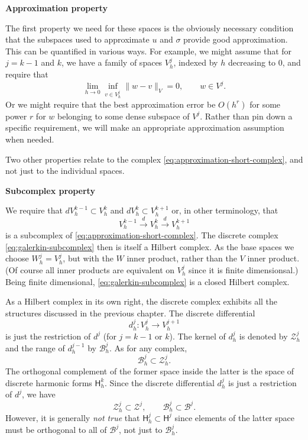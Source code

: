 \medskip\noindent\textbf{{Approximation property}}\par
{The first property we need for these spaces is the obviously necessary condition that the subspaces used to approximate $u$ and $\sigma$ provide good approximation. This can be quantified in various ways. For example, we might assume that for $j=k-1$ and $k$, we have a family of spaces $V_h^j$, indexed by $h$ decreasing to $0$, and require that}
\begin{equation}\label{eq:galerkin-approximation-property}
\lim_{h\to0}\inf_{v\in V_h^j}\|w-v\|_V=0,\qquad w\in V^j.
\end{equation}
{Or we might require that the best approximation error be $O(h^r)$ for some power $r$ for $w$ belonging to some dense subspace of $V^j$. Rather than pin down a specific requirement, we will make an appropriate approximation assumption when needed.}

{Two other properties relate to the complex \eqref{eq:approximation-short-complex}, and not just to the individual spaces.}

\medskip\noindent\textbf{{Subcomplex property}}\par
{We require that $dV_h^{k-1}\subset V_h^k$ and $dV_h^k\subset V_h^{k+1}$ or, in other terminology, that}
\begin{equation}\label{eq:galerkin-subcomplex}
V_h^{k-1}\xrightarrow{d}V_h^k\xrightarrow{d}V_h^{k+1}
\end{equation}
{is a subcomplex of \eqref{eq:approximation-short-complex}. The discrete complex \eqref{eq:galerkin-subcomplex} then is itself a Hilbert complex. As the base spaces we choose $W_h^j=V_h^j$, but with the $W$ inner product, rather than the $V$ inner product. (Of course all inner products are equivalent on $V_h^j$ since it is finite dimensionsal.) Being finite dimensional, \eqref{eq:galerkin-subcomplex} is a closed Hilbert complex.}

{As a Hilbert complex in its own right, the discrete complex exhibits all the structures discussed in the previous chapter. The discrete differential}
\[
d_h^j:V_h^j\to V_h^{j+1}
\]
{is just the restriction of $d^j$ (for $j=k-1$ or $k$). The kernel of $d_h^j$ is denoted by $\mathcal Z_h^j$ and the range of $d_h^{j-1}$ by $\mathcal B_h^j$. As for any complex,}
\[
\mathcal B_h^j\subset\mathcal Z_h^j.
\]
{The orthogonal complement of the former space inside the latter is the space of discrete harmonic forms $\mathsf H_h^k$. Since the discrete differential $d_h^j$ is just a restriction of $d^j$, we have}
\[
\mathcal Z_h^j\subset\mathcal Z^j,\qquad\mathcal B_h^j\subset\mathcal B^j.
\]
{However, it is generally \emph{not true} that $\mathsf H_h^j\subset\mathsf H^j$ since elements of the latter space must be orthogonal to all of $\mathcal B^j$, not just to $\mathcal B_h^j$.}

